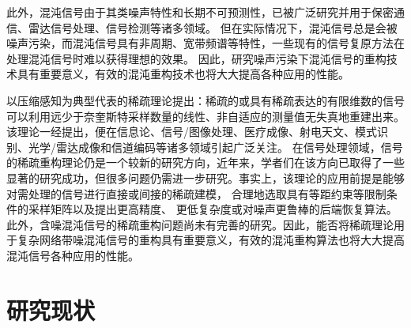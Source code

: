 此外，混沌信号由于其类噪声特性和长期不可预测性，已被广泛研究并用于保密通信、雷达信号处理、信号检测等诸多领域。
但在实际情况下，混沌信号总是会被噪声污染，而混沌信号具有非周期、宽带频谱等特性，一些现有的信号复原方法在处理混沌信号时难以获得理想的效果。
因此，研究噪声污染下混沌信号的重构技术具有重要意义，有效的混沌重构技术也将大大提高各种应用的性能。

以压缩感知为典型代表的稀疏理论提出：稀疏的或具有稀疏表达的有限维数的信号可以利用远少于奈奎斯特采样数量的线性、非自适应的测量值无失真地重建出来。
该理论一经提出，便在信息论、信号/图像处理、医疗成像、射电天文、模式识别、光学/雷达成像和信道编码等诸多领域引起广泛关注。
在信号处理领域，信号的稀疏重构理论仍是一个较新的研究方向，近年来，学者们在该方向已取得了一些显著的研究成功，但很多问题仍需进一步研究。事实上，该理论的应用前提是能够对需处理的信号进行直接或间接的稀疏建模，
合理地选取具有等距约束等限制条件的采样矩阵以及提出更高精度、
更低复杂度或对噪声更鲁棒的后端恢复算法。此外，含噪混沌信号的稀疏重构问题尚未有完善的研究。因此，能否将稀疏理论用于复杂网络带噪混沌信号的重构具有重要意义，有效的混沌重构算法也将大大提高混沌信号各种应用的性能。

\section{研究现状}
